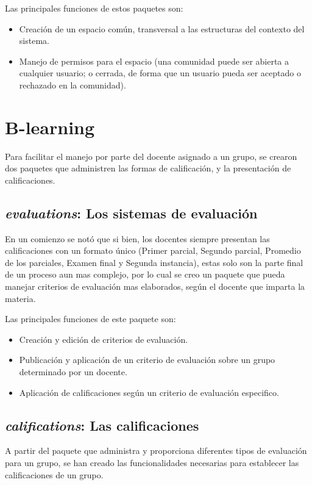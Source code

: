 Las principales funciones de estos paquetes son:

\begin{itemize}
\item Creación de un espacio común, transversal a las estructuras del contexto
del sistema.
\item Manejo de permisos para el espacio (una comunidad puede ser abierta a
cualquier usuario; o cerrada, de forma que un usuario pueda ser aceptado o
rechazado en la comunidad).
\end{itemize}

\section{B-learning}
Para facilitar el manejo por parte del docente asignado a un grupo, se crearon
dos paquetes que administren las formas de calificación, y la presentación de
calificaciones.

\subsection{\emph{evaluations}: Los sistemas de evaluación}
En un comienzo se notó que si bien, los docentes siempre presentan las
calificaciones con un formato único (Primer parcial, Segundo parcial, Promedio
de los parciales, Examen final y Segunda instancia), estas solo son la parte
final de un proceso aun mas complejo, por lo cual se creo un paquete que pueda
manejar criterios de evaluación mas elaborados, según el docente que imparta la
materia.

Las principales funciones de este paquete son:

\begin{itemize}
\item Creación y edición de criterios de evaluación.
\item Publicación y aplicación de un criterio de evaluación sobre un grupo
determinado por un docente.
\item Aplicación de calificaciones según un criterio de evaluación especifico.
\end{itemize}

\subsection{\emph{califications}: Las calificaciones}
A partir del paquete que administra y proporciona diferentes tipos de evaluación
para un grupo, se han creado las funcionalidades necesarias para establecer las
calificaciones de un grupo.


